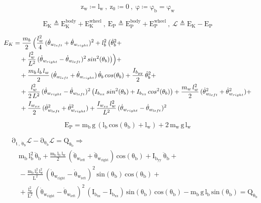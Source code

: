 \documentclass[11pt]{article}
\begin{document}
\[
  \mathrm{
    z_w \coloneq l_w \: , \: z_0 \coloneq 0 \: , \: \varphi \coloneq \varphi_b = \varphi_w
  }
\]

\[
  \mathrm{
    E_K \triangleq E_K^{body} + E_K^{wheel} \: , \: E_P \triangleq E_P^{body} + E_P^{wheel} \: , \: \mathcal{L} \triangleq E_K - E_P
  }
\]

\[
  \mathrm{
    \begin{aligned}
      E_K &= \frac{m_b}{2} \, \Bigl( \frac{l_w^2}{4} \, ( \dot{\theta}_{w_{left}} + \dot{\theta}_{w_{right}} )^2 + l_b^2 \, \bigl( \dot{\theta}_b^2 + \\
          & \quad + \frac{l_w^2}{L^2} \, ( \dot{\theta}_{w_{right}} - \dot{\theta}_{w_{left}} )^2 \, sin^2(\theta_b) \bigr) \Bigr) + \\
          & \quad + \frac{m_b \, l_b \, l_w}{2} \, ( \dot{\theta}_{w_{left}}  + \dot{\theta}_{w_{right}} ) \, \dot{\theta}_b \, cos(\theta_b)  + \frac{I_{b_{yy}}}{2} \, \dot{\theta}_b^2 + \\
          & \quad + \frac{l_w^2}{2 \, L^2} \, ( \dot{\theta}_{w_{right}} - \dot{\theta}_{w_{left}} )^2 \, \bigl( I_{b_{xx}} \, sin^2(\theta_b) + I_{b_{zz}} \, cos^2(\theta_b) \bigr) + \frac{m_w \, l_w^2}{2} \, ( \dot{\theta}_{w_{left}}^2 + \dot{\theta}_{w_{right}}^2 ) + \\
          & \quad + \frac{I_{w_{xx}}}{2} \, ( \dot{\theta}_{w_{left}}^2 + \dot{\theta}_{w_{right}}^2 ) + \frac{I_{w_{zz}} \, l_w^2}{L^2} \, ( \dot{\theta}_{w_{right}} - \dot{\theta}_{w_{left}} )^2
    \end{aligned}
  }
\]

\[
  \mathrm{
    E_P = m_b \, g \, ( l_b \, cos(\theta_b) + l_w ) + 2 \, m_w \, g \, l_w
  }
\]

\[
  \mathrm{
    \begin{aligned}
      & \partial_{t \, , \, \dot{\theta}_b} \mathcal{L} - \partial_{\theta_b} \mathcal{L} = Q_{\theta_b} \Rightarrow \\
      & \quad m_b \, l_b^2 \, \ddot{\theta}_b + \frac{m_b \, l_b \, l_w}{2} \, ( \ddot{\theta}_{w_{left}} + \ddot{\theta}_{w_{right}} ) \, cos(\theta_b) +  I_{b_{yy}} \, \ddot{\theta}_b + \\
      & \quad - \frac{m_b \, l_b^2 \, l_w^2}{L^2} \, ( \dot{\theta}_{w_{right}} - \dot{\theta}_{w_{left}} )^2 \, sin(\theta_b) \, cos(\theta_b) + \\
      & \quad + \frac{l_w^2}{L^2} \, ( \dot{\theta}_{w_{right}} - \dot{\theta}_{w_{left}} )^2 \, ( I_{b_{zz}} - I_{b_{xx}} ) \, sin(\theta_b) \, cos(\theta_b) - m_b \, g \, l_b \, sin(\theta_b) = Q_{\theta_b}
    \end{aligned}
  }
\]
\end{document}
